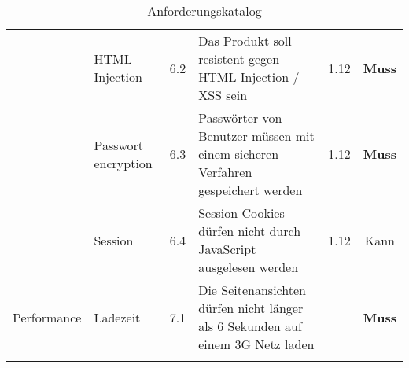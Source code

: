 \begin{longtable}[]{@{}p{1.9cm}p{2.5cm}cp{5.5cm}cc@{}}
                             & HTML-Injection             & 6.2          & Das Produkt soll resistent gegen HTML-Injection / XSS sein                                                  & 1.12          & \textbf{Muss}                \\ \cline{2-6}
                             & Passwort encryption        & 6.3          & Passwörter von Benutzer müssen mit einem sicheren Verfahren gespeichert werden                              & 1.12          & \textbf{Muss}                \\ \cline{2-6}
                             & Session                    & 6.4          & Session-Cookies dürfen nicht durch JavaScript ausgelesen werden                                             & 1.12          & Kann                         \\
  \midrule
  Performance                & Ladezeit                   & 7.1          & Die Seitenansichten dürfen nicht länger als 6 Sekunden auf einem 3G Netz laden                              &               & \textbf{Muss}                \\
  \bottomrule
  \caption{Anforderungskatalog}
\end{longtable}
